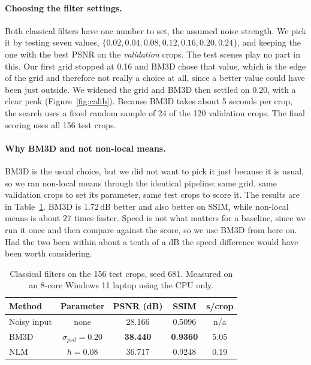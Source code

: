 \documentclass[11pt]{article}
\begin{document}
\paragraph{Choosing the filter settings.}
Both classical filters have one number to set, the assumed noise strength. We pick it by
testing seven values, $\{0.02, 0.04, 0.08, 0.12, 0.16, 0.20, 0.24\}$, and keeping the one
with the best PSNR on the \emph{validation} crops. The test scenes play no part in this.
Our first grid stopped at 0.16 and BM3D chose that value, which is the edge of the grid and
therefore not really a choice at all, since a better value could have been just outside. We
widened the grid and BM3D then settled on 0.20, with a clear peak
(Figure~\ref{fig:calib}). Because BM3D takes about 5 seconds per crop, the search uses a
fixed random sample of 24 of the 120 validation crops. The final scoring uses all 156 test
crops.

\paragraph{Why BM3D and not non-local means.}
BM3D is the usual choice, but we did not want to pick it just because it is usual, so we
ran non-local means \citep{buades2011nlm} through the identical pipeline: same grid, same
validation crops to set its parameter, same test crops to score it. The results are in
Table~\ref{tab:baselines}. BM3D is 1.72\,dB better and also better on SSIM, while
non-local means is about 27 times faster. Speed is not what matters for a baseline, since
we run it once and then compare against the score, so we use BM3D from here on. Had the two
been within about a tenth of a dB the speed difference would have been worth considering.

\begin{table}[ht]
\centering
\caption{Classical filters on the 156 test crops, seed 681. Measured on an 8-core
Windows 11 laptop using the CPU only.}
\label{tab:baselines}
\begin{tabular}{@{}lcccc@{}}
\toprule
\textbf{Method} & \textbf{Parameter} & \textbf{PSNR (dB)} & \textbf{SSIM} & \textbf{s/crop} \\
\midrule
Noisy input & none                   & 28.166 & 0.5096 & n/a  \\
BM3D        & $\sigma_{psd} = 0.20$  & \textbf{38.440} & \textbf{0.9360} & 5.05 \\
NLM         & $h = 0.08$             & 36.717 & 0.9248 & 0.19 \\
\bottomrule
\end{tabular}
\end{table}
\end{document}
